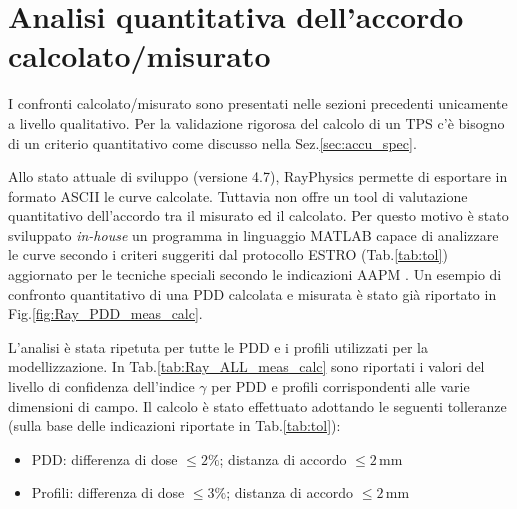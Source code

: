 \section{Analisi quantitativa dell'accordo calcolato/misurato}
I confronti calcolato/misurato sono presentati nelle sezioni precedenti unicamente a livello qualitativo. Per la validazione rigorosa del calcolo di un TPS c'è bisogno di un criterio quantitativo come discusso nella Sez.\ref{sec:accu_spec}. 

Allo stato attuale di sviluppo (versione 4.7), RayPhysics permette di esportare in formato ASCII le curve calcolate. Tuttavia non offre un tool di valutazione quantitativo dell'accordo tra il misurato ed il calcolato. Per questo motivo è stato sviluppato \textit{in-house} un programma in linguaggio MATLAB capace di analizzare le curve secondo i criteri suggeriti dal protocollo ESTRO \cite{Mijnheer2004} (Tab.\ref{tab:tol}) aggiornato per le tecniche speciali secondo le indicazioni AAPM \cite{Ezzell2009}. Un esempio di confronto quantitativo di una PDD calcolata e misurata è stato già riportato in Fig.\ref{fig:Ray_PDD_meas_calc}.

L'analisi è stata ripetuta per tutte le PDD e i profili utilizzati per la modellizzazione. In Tab.\ref{tab:Ray_ALL_meas_calc} sono riportati i valori del livello di confidenza dell'indice $\gamma$ per PDD e profili corrispondenti alle varie dimensioni di campo. Il calcolo è stato effettuato adottando le seguenti tolleranze (sulla base delle indicazioni riportate in Tab.\ref{tab:tol}):
\begin{itemize}
\item PDD: differenza di dose $\leq 2\%$; distanza di accordo $\leq 2\,$mm
\item Profili: differenza di dose $\leq 3\%$; distanza di accordo $\leq 2\,$mm
\end{itemize}

